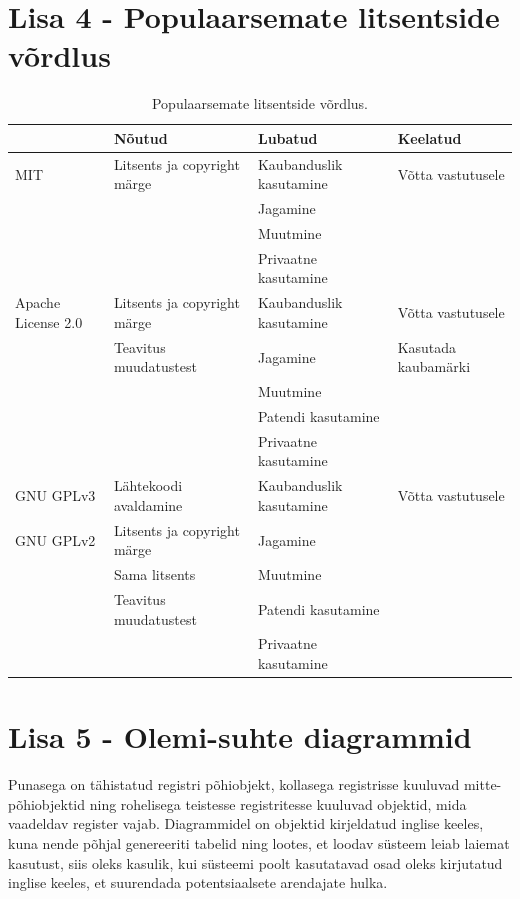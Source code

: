 \documentclass[a4paper,12pt]{article} %
\begin{document}
\section*{Lisa 4 - Populaarsemate litsentside võrdlus}
\label{lisa1}
\begin{table}[H]
\centering
\caption{Populaarsemate litsentside võrdlus.}
\label{table_litsentside_vordlus}
\begin{tabular}{|p{3cm}|p{4cm}|p{4cm}|p{4cm}|}
\hline
\rowcolor{rowgray}
 & Nõutud & Lubatud & Keelatud \\ \hline
MIT & Litsents ja copyright märge & Kaubanduslik kasutamine & Võtta vastutusele \\
 &  & Jagamine &  \\
 &  & Muutmine &  \\
 &  & Privaatne kasutamine &  \\ \hline
Apache \newline License 2.0 & Litsents ja copyright märge & Kaubanduslik kasutamine & Võtta vastutusele \\
 & Teavitus muudatustest & Jagamine & Kasutada kaubamärki \\
 &  & Muutmine &  \\
 &  & Patendi kasutamine &  \\
 &  & Privaatne kasutamine &  \\ \hline
GNU GPLv3 & Lähtekoodi avaldamine & Kaubanduslik kasutamine & Võtta vastutusele \\
GNU GPLv2 & Litsents ja copyright märge & Jagamine &  \\
 & Sama litsents & Muutmine &  \\
 & Teavitus muudatustest & Patendi kasutamine &  \\
 &  & Privaatne kasutamine & \\ \hline
\end{tabular}
\cite{Licences}
\end{table}
\pagebreak

\section*{Lisa 5 - Olemi-suhte diagrammid}
\label{lisa_olemi_suhte_diagrammid}
Punasega on tähistatud registri põhiobjekt, kollasega registrisse kuuluvad mitte-põhiobjektid ning rohelisega teistesse registritesse kuuluvad objektid, mida vaadeldav register vajab. Diagrammidel on objektid kirjeldatud inglise keeles, kuna nende põhjal genereeriti tabelid ning lootes, et loodav süsteem leiab laiemat kasutust, siis oleks kasulik, kui süsteemi poolt kasutatavad osad oleks kirjutatud inglise keeles, et suurendada potentsiaalsete arendajate hulka.
\end{document}
